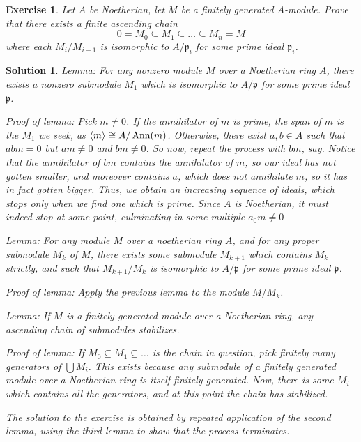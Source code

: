 \documentclass{article}
\newtheorem{ex}{Exercise}
\theoremstyle{nonumberplain}
\newtheorem{sol}{Solution}
\newcommand{\gp}{\mathfrak{p}}
\DeclareMathOperator{\Ann}{Ann}
\DeclarePairedDelimiter{\braket}{\langle}{\rangle}
\begin{document}
\begin{ex}
Let $A$ be Noetherian, let $M$ be a finitely generated $A$-module. Prove that there exists a finite ascending chain
\begin{equation}
0 = M_0 \subseteq M_1 \subseteq \dots \subseteq M_n = M
\end{equation}
where each $M_i/M_{i-1}$ is isomorphic to $A/\gp_i$ for some prime ideal $\gp_i$.
\end{ex}

\begin{sol}
Lemma: For any nonzero module $M$ over a Noetherian ring $A$, there exists a nonzero submodule $M_1$ which is isomorphic to $A/\gp$ for some prime ideal $\gp$.

Proof of lemma: Pick $m \neq 0$. If the annihilator of $m$ is prime, the span of $m$ is the $M_1$ we seek, as $\braket m \cong A/\Ann(m)$. Otherwise, there exist $a,b \in A$ such that $abm = 0$ but $am \neq 0$ and $bm \neq 0$. So now, repeat the process with $bm$, say. Notice that the annihilator of $bm$ contains the annihilator of $m$, so our ideal has not gotten smaller, and moreover contains $a$, which does not annihilate $m$, so it has in fact gotten bigger. Thus, we obtain an increasing sequence of ideals, which stops only when we find one which is prime. Since $A$ is Noetherian, it must indeed stop at some point, culminating in some multiple $a_0 m \neq 0$

Lemma: For any module $M$ over a noetherian ring $A$, and for any proper submodule $M_k$ of $M$, there exists some submodule $M_{k+1}$ which contains $M_k$ strictly, and such that $M_{k+1}/M_k$ is isomorphic to $A/\gp$ for some prime ideal $\gp$.

Proof of lemma: Apply the previous lemma to the module $M/M_k$.

Lemma: If $M$ is a finitely generated module over a Noetherian ring, any ascending chain of submodules stabilizes.

Proof of lemma: If $M_0 \subseteq M_1 \subseteq \dots$ is the chain in question, pick finitely many generators of $\bigcup M_i$. This exists because any submodule of a finitely generated module over a Noetherian ring is itself finitely generated. Now, there is some $M_i$ which contains all the generators, and at this point the chain has stabilized.

\smallskip

The solution to the exercise is obtained by repeated application of the second lemma, using the third lemma to show that the process terminates.
\end{sol}
\end{document}
